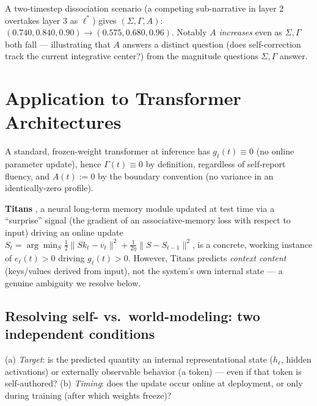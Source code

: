 \documentclass[11pt]{article}
\begin{document}
A two-timestep dissociation scenario (a competing sub-narrative in layer 2 overtakes layer 3 as $\ell^*$) gives $(\Sigma,\Gamma,A)$: $(0.740,0.840,0.90)\to(0.575,0.680,0.96)$. Notably $A$ \emph{increases} even as $\Sigma,\Gamma$ both fall --- illustrating that $A$ answers a distinct question (does self-correction track the current integrative center?) from the magnitude questions $\Sigma,\Gamma$ answer.

\section{Application to Transformer Architectures}

A standard, frozen-weight transformer at inference has $g_\ell(t)\equiv0$ (no online parameter update), hence $\Gamma(t)\equiv0$ by definition, regardless of self-report fluency, and $A(t):=0$ by the boundary convention (no variance in an identically-zero profile).

\textbf{Titans} \cite{behrouz2024}, a neural long-term memory module updated at test time via a ``surprise'' signal (the gradient of an associative-memory loss with respect to input) driving an online update $S_t=\arg\min_S\frac12\|Sk_t-v_t\|^2+\frac1{2\eta}\|S-S_{t-1}\|^2$, is a concrete, working instance of $e_\ell(t)>0$ driving $g_\ell(t)>0$. However, Titans predicts \emph{context content} (keys/values derived from input), not the system's own internal state --- a genuine ambiguity we resolve below.

\subsection*{Resolving self- vs.\ world-modeling: two independent conditions}
(a) \emph{Target}: is the predicted quantity an internal representational state ($h_\ell$, hidden activations) or externally observable behavior (a token) --- even if that token is self-authored? (b) \emph{Timing}: does the update occur online at deployment, or only during training (after which weights freeze)?
\end{document}
